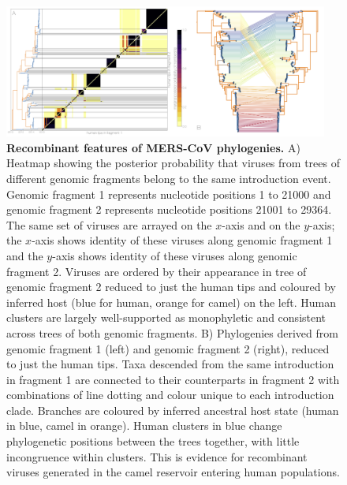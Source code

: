 \documentclass[11pt,oneside,letterpaper]{article}
\begin{document}
\begin{figure}%
    \centering
    \includegraphics[width=0.95\textwidth]{figures/mers_recombinant_features.png}
    \caption{\textbf{Recombinant features of MERS-CoV phylogenies.}
    A) Heatmap showing the posterior probability that viruses from trees of different genomic fragments belong to the same introduction event.
    Genomic fragment 1 represents nucleotide positions 1 to 21000 and genomic fragment 2 represents nucleotide positions 21001 to 29364.
    The same set of viruses are arrayed on the $x$-axis and on the $y$-axis; the $x$-axis shows identity of these viruses along genomic fragment 1 and the $y$-axis shows identity of these viruses along genomic fragment 2.
    Viruses are ordered by their appearance in tree of genomic fragment 2 reduced to just the human tips and coloured by inferred host (blue for human, orange for camel) on the left.
    Human clusters are largely well-supported as monophyletic and consistent across trees of both genomic fragments.
    B) Phylogenies derived from genomic fragment 1 (left) and genomic fragment 2 (right), reduced to just the human tips.
  	Taxa descended from the same introduction in fragment 1 are connected to their counterparts in fragment 2 with combinations of line dotting and colour unique to each introduction clade.
  	Branches are coloured by inferred ancestral host state (human in blue, camel in orange).
  	Human clusters in blue change phylogenetic positions between the trees together, with little incongruence within clusters.
  	This is evidence for recombinant viruses generated in the camel reservoir entering human populations.
    }
    \label{recombinant_features}
\end{figure}
\end{document}
